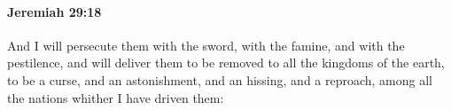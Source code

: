 
		\paragraph{Jeremiah 29:18} %
			\label{JEREMIAH-29-18}

			And I will persecute them with the sword, with the famine, and with the pestilence, and will deliver them to be removed to all the kingdoms of the earth, to be a curse, and an astonishment, and an hissing, and a reproach, among all the nations whither I have driven them:



